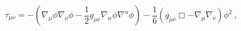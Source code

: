\begin{equation}
\tau_{\mu \nu}= -(\nabla_{\mu }
\phi \nabla_{\nu}\phi-\frac{1}{2}g_{\mu \nu} \nabla_{\alpha  }\phi
\nabla^{\alpha  }\phi)-\frac{1}{6}(g_{\mu \nu} \Box-\nabla_{\mu }
\nabla_{\nu})\phi^2~,
\end{equation}

